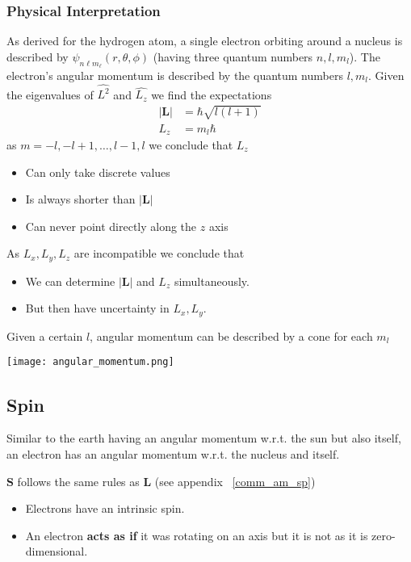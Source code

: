 \subsubsection{Physical Interpretation}
As derived for the hydrogen atom, a single electron orbiting around a nucleus is described by $\psi_{n\ell m_\ell}(r,\theta,\phi)$ (having three quantum numbers $n,l,m_l$). The electron's angular momentum is described by the quantum numbers $l,m_l$. Given the eigenvalues of $\hat{L^2}$ and $\hat{L_z}$ we find the expectations
\begin{align*}
    |\mathbf{L}| & =\hbar\sqrt{l(l+1)} \\
    L_{z}        & =m_{l}\hbar
\end{align*}
as $m=-l,-l+1,\dots,l-1,l$ we conclude that $L_{z}$
\begin{itemize}
    \item Can only take discrete values
    \item Is always shorter than $|\mathbf{L}|$
    \item Can never point directly along the $z$ axis
\end{itemize}
As $L_x, L_y, L_z$ are incompatible we conclude that
\begin{itemize}
    \item We can determine $|\mathbf{L}|$ and $L_{z}$ simultaneously.
    \item But then have uncertainty in $L_x, L_y$.
\end{itemize}
Given a certain $l$, angular momentum can be described by a cone for each $m_l$
\begin{center}
    \texttt{[image: angular\_momentum.png]}
\end{center}

\subsection{Spin}
Similar to the earth having an angular momentum w.r.t. the sun but also itself, an electron has an angular momentum w.r.t. the nucleus and itself.


$\mathbf{S}$ follows the same rules as $\mathbf{L}$ (see appendix ~\ref{comm_am_sp})


\begin{itemize}
    \item Electrons have an intrinsic spin.
    \item An electron \textbf{acts as if} it was rotating on an axis but it is not as it is zero-dimensional.
\end{itemize}


